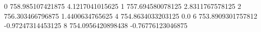 0 758.985107421875 4.1217041015625
1 757.694580078125 2.8311767578125
2 756.303466796875 1.4400634765625
4 754.8634033203125 0.0
6 753.8909301757812 -0.97247314453125
8 754.0956420898438 -0.76776123046875
